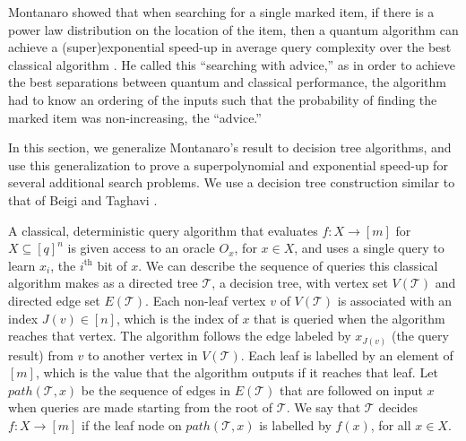 \documentclass[cleveref, autoref, thm-restate,11pt]{article}
\theoremstyle{definition}
\newcommand{\sop}[1]{{\mathcal #1}}
\begin{document}


Montanaro showed that when searching for a single marked item, if there is 
a power law distribution on the location of the item, then a quantum algorithm can achieve a (super)exponential 
speed-up in average query complexity over the best classical algorithm
\cite{montanaro2010quantum}. He called this ``searching with advice,'' as
in order to achieve the best separations between quantum and classical performance,
 the algorithm had to know an ordering of the inputs such that
 the probability of finding the marked item was non-increasing, the ``advice.'' 



In this section, we generalize Montanaro's result to
decision tree algorithms, and use this generalization to 
prove a superpolynomial and exponential speed-up for several additional search problems.
We use a decision tree construction similar to that of
Beigi and Taghavi \cite{beigiQuantumSpeedupBased2019}. 

A classical, deterministic query algorithm that
evaluates $f:X\rightarrow [m]$ for $X\subseteq [q]^n$ is given access to an
oracle $O_x$, for $x\in X$, and uses a single query to learn $x_i$, the
$i^\textrm{th}$ bit of $x.$
We can describe the sequence of queries this classical algorithm makes as a
directed tree $\sop T$, a decision tree,
with vertex set $V(\sop T)$ and directed edge set 
$E(\sop T)$. Each non-leaf vertex $v$ of $V(\sop T)$ is
associated with an index $J(v)\in [n]$, which is the index of $x$ that is queried
when the algorithm reaches that vertex. The algorithm follows the edge labeled by $x_{J(v)}$ (the query result) from $v$ to another vertex in $V(\sop T)$.
Each leaf is labelled by an element of $[m]$, which is the value that the
algorithm outputs if it reaches that leaf. Let $path(\sop T, x)$ be the sequence
of edges in $E(\sop T)$ that are followed on input $x$ when queries
are made starting from the root of $\sop T$. We say that $\sop T$ 
decides $f:X\rightarrow [m]$ if the leaf node on $path(\sop T, x)$ is labelled by $f(x)$, for all $x\in X$.
\end{document}
